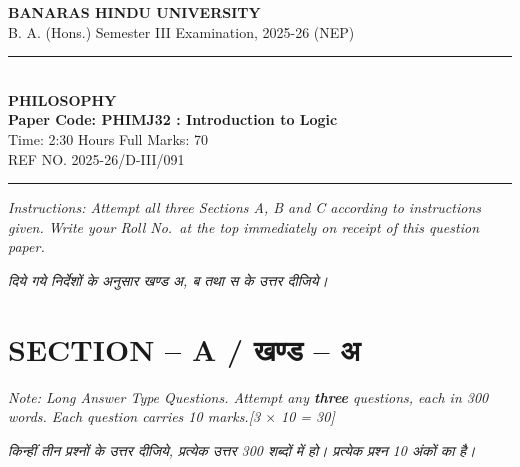\documentclass[11pt,a4paper]{article}
\newcommand{\pts}[1]{\hfill \textit{[#1]}}
\begin{document}
\begin{center}
  {\large\bfseries BANARAS HINDU UNIVERSITY}\\[2pt]
  {\normalsize B. A. (Hons.) Semester III Examination, 2025-26 (NEP)}\\[6pt]
  \rule{0.8\linewidth}{0.5pt}\\[6pt]
  {\large\bfseries PHILOSOPHY}\\[4pt]
  {\large\bfseries Paper Code: PHIMJ32 : Introduction to Logic}\\[4pt]
  {\normalsize Time: 2:30 Hours \hfill Full Marks: 70}\\[2pt]
  {\small REF NO. 2025-26/D-III/091}
\end{center}
\rule{\linewidth}{0.4pt}
\smallskip

\noindent \textit{Instructions: Attempt all three Sections A, B and C according to instructions given. Write your Roll No.\ at the top immediately on receipt of this question paper.}

\smallskip
\noindent \textit{दिये गये निर्देशों के अनुसार खण्ड अ, ब तथा स के उत्तर दीजिये।}

\bigskip

\section*{SECTION -- A / खण्ड -- अ}
\noindent \textit{Note: Long Answer Type Questions. Attempt any \textbf{three} questions, each in 300 words. Each question carries 10 marks.}\pts{3 $\times$ 10 = 30}

\noindent \textit{किन्हीं तीन प्रश्नों के उत्तर दीजिये, प्रत्येक उत्तर 300 शब्दों में हो। प्रत्येक प्रश्न 10 अंकों का है।}
\end{document}
